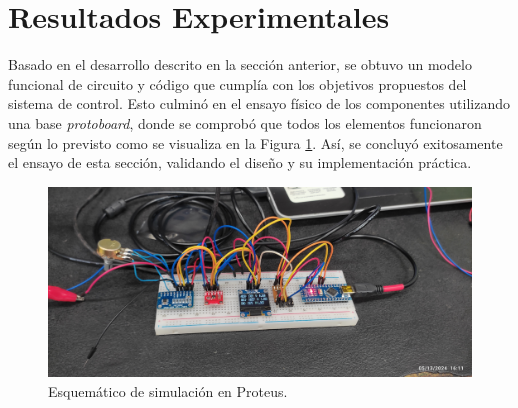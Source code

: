 \section{Resultados Experimentales}
Basado en el desarrollo descrito en la sección anterior, se obtuvo un modelo funcional de circuito y código que cumplía con los objetivos propuestos del sistema de control. Esto culminó en el ensayo físico de los componentes utilizando una base \textit{protoboard}, donde se comprobó que todos los elementos funcionaron según lo previsto como se visualiza en la Figura \ref{F:ensayo_digital}. Así, se concluyó exitosamente el ensayo de esta sección, validando el diseño y su implementación práctica.
\begin{figure}[H]
    \centering
    \includegraphics[scale=0.08]{./imagenes/ensayo_digital.jpg}
    \caption{Esquemático de simulación en Proteus.}
    \label{F:ensayo_digital}
\end{figure}